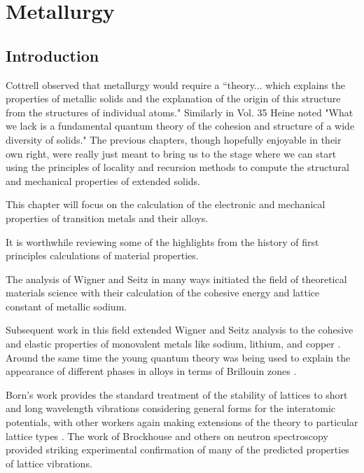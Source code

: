 \chapter{Metallurgy}
\label{chap:metallurgy}
\section{Introduction}
Cottrell observed that metallurgy would require a ``theory... which explains
the properties of metallic solids and the explanation of the origin of this
structure from the structures of individual atoms." Similarly in Vol. 35
Heine noted "What we lack is a fundamental quantum theory of the cohesion
and structure of a wide diversity of solids." The previous chapters,
though hopefully enjoyable in their own right, were really just meant to bring
us to the stage where we can start using the principles of locality
and recursion methods to compute the structural and 
mechanical properties of extended solids.

This chapter will focus on the calculation of the electronic and mechanical
properties of transition metals and their alloys. 


It is worthwhile reviewing some of the highlights from the history
of first principles calculations of material properties.

The analysis of Wigner and Seitz in many ways initiated the field
of theoretical materials science with their calculation of the cohesive
energy and lattice constant of metallic sodium\cite{wigner33, wigner34}.

Subsequent work in this field extended Wigner and Seitz analysis
to the cohesive and elastic properties of monovalent
metals like sodium, lithium, and copper \cite{fuchs36}. Around
the same time the young quantum theory was being
used to explain the appearance of different phases in alloys in terms 
of Brillouin zones \cite{bethe29, bouckhaert36, owen33, jones34}. 

Born's work provides the standard treatment of 
the stability of lattices to short and long wavelength
vibrations considering general forms for the interatomic potentials\cite{born40,born42},
with other workers again making extensions of the theory to particular
lattice types \cite{power41, nabarro52}. The work of Brockhouse and
others on neutron spectroscopy provided striking experimental confirmation
of many of the predicted properties of lattice vibrations.

